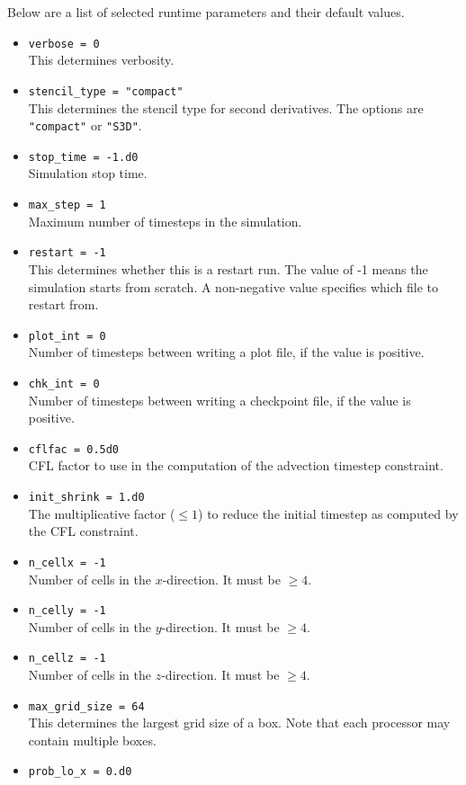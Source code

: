 \documentclass[11pt,letterpaper]{article}
\begin{document}
Below are a list of selected runtime parameters and their default values.
\begin{itemize}
\item {\tt verbose = 0}\\
  This determines verbosity.
\item {\tt stencil\_type = "compact"}\\
  This determines the stencil type for second derivatives. The options
  are {\tt "compact"} or {\tt "S3D"}.
\item {\tt stop\_time = -1.d0}\\
  Simulation stop time.
\item {\tt max\_step = 1}\\
  Maximum number of timesteps in the simulation.
\item {\tt restart = -1}\\
  This determines whether this is a restart run.  The value of -1
  means the simulation starts from scratch.  A non-negative value
  specifies which file to restart from.
\item {\tt plot\_int = 0}\\
  Number of timesteps between writing a plot file, if the value is
  positive. 
\item {\tt chk\_int = 0}\\
  Number of timesteps between writing a checkpoint file, if the value is
  positive.
\item {\tt cflfac = 0.5d0}\\
  CFL factor to use in the computation of the advection timestep
  constraint. 
\item {\tt init\_shrink = 1.d0}\\
  The multiplicative factor ($\le 1$) to reduce the initial timestep as 
  computed by the CFL constraint.
\item {\tt n\_cellx = -1}\\
  Number of cells in the $x$-direction.  It must be $\ge 4$.
\item {\tt n\_celly = -1}\\
  Number of cells in the $y$-direction.  It must be $\ge 4$.
\item {\tt n\_cellz = -1}\\
  Number of cells in the $z$-direction.  It must be $\ge 4$.
\item {\tt max\_grid\_size = 64}\\
  This determines the largest grid size of a box.  Note that each
  processor may contain multiple boxes.
\item {\tt prob\_lo\_x = 0.d0}\\

\end{itemize}
\end{document}
